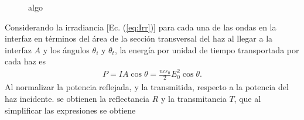 \begin{figure}
	\caption{algo} \label{fig:hazcircular}
	\end{figure}


Considerando la irradiancia [Ec. (\ref{eq:Irr})] para cada una de las ondas en la interfaz en términos del área de la sección transversal del haz al llegar a la interfaz $A$ y los ángulos $\theta_i$ y $\theta_t$, la energía por unidad de tiempo transportada por cada haz es
	\begin{align*}
	P = I A \cos\theta = \frac{n c \varepsilon_0}{2} E_{0}^2 \cos\theta. 
	\end{align*}
Al normalizar la potencia reflejada, y la transmitida, respecto a la potencia del haz incidente.  se obtienen  la reflectancia $R$ y la transmitancia $T$, que al simplificar las expresiones se obtiene
	\begin{tcolorbox}[title = Reflectancia y transmitancia]
	\end{tcolorbox}	 \vspace*{-1em}\noindent	

